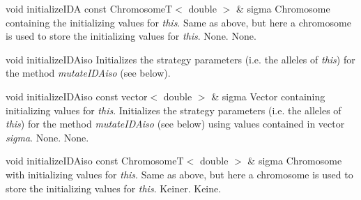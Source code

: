 \vspace*{4ex}

\setNormalInstance
\printMethodWithOneParam
{void}
{initializeIDA}
{const ChromosomeT$<$ double $>$ \&}
{sigma}
{Chromosome containing the initializing values for {\em this}.}
{Same as above, but here a chromosome is used to store the
 initializing values for {\em this}.}
{None.}
{None.}

\vspace*{4ex}

\setNormalInstance
\setCorrectWidthThree{8pt}
\printMethodWithParamsSaved
{void}
{}
{initializeIDAiso}
{Initializes the strategy parameters (i.e. the alleles of
 {\em this}) for the method {\em mutateIDAiso} (see below).}
{}
\setCorrectWidthThree{4pt}

\vspace*{4ex}

\setNormalInstance
\printMethodWithOneParam
{void}
{initializeIDAiso}
{const vector$<$ double $>$ \&}
{sigma}
{Vector containing initializing values for {\em this}.}
{Initializes the strategy parameters (i.e. the alleles of
 {\em this}) for the method {\em mutateIDAiso} (see below) using
 values contained in vector {\em sigma}.}
{None.}
{None.}

\clearpage

\setNormalInstance
\printMethodWithOneParam
{void}
{initializeIDAiso}
{const ChromosomeT$<$ double $>$ \&}
{sigma}
{Chromosome with initializing values for {\em this}.}
{Same as above, but here a chromosome is used to store the
 initializing values for {\em this}.}
{Keiner.}
{Keine.}









